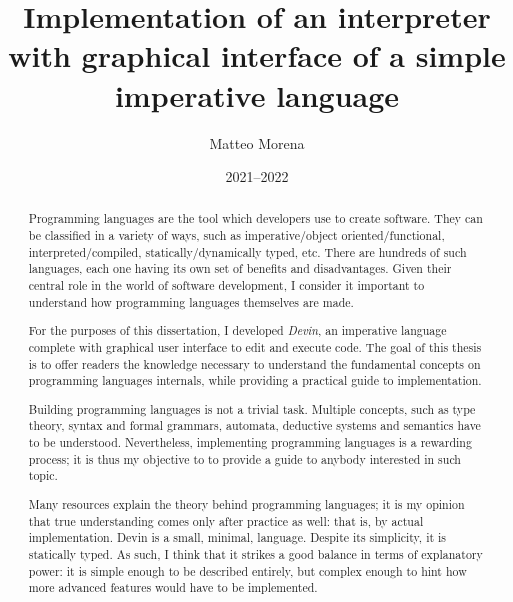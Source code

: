 \documentclass[UdineBachThesis,american,11pt]{PhdThesis}
\author{Matteo Morena}
\date{2021--2022}
\title{
  Implementation of an interpreter with graphical interface of a simple
  imperative language
}
\begin{document}
  \pagestyle{empty}

  \maketitle

  \cleardoublepage


  \begin{abstract}
    Programming languages are the tool which developers use to create software.
    They can be classified in a variety of ways, such as imperative/object
    oriented/functional, interpreted/compiled, statically/dynamically typed,
    etc. There are hundreds of such languages, each one having its own set of
    benefits and disadvantages. Given their central role in the world of
    software development, I consider it important to understand how programming
    languages themselves are made.

    For the purposes of this dissertation, I developed \emph{Devin}, an
    imperative language complete with graphical user interface to edit and
    execute code. The goal of this thesis is to offer readers the knowledge
    necessary to understand the fundamental concepts on programming languages
    internals, while providing a practical guide to implementation.

    Building programming languages is not a trivial task. Multiple concepts,
    such as type theory, syntax and formal grammars, automata, deductive systems
    and semantics have to be understood. Nevertheless, implementing programming
    languages is a rewarding process; it is thus my objective to to provide a
    guide to anybody interested in such topic.

    Many resources explain the theory behind programming languages; it is my
    opinion that true understanding comes only after practice as well: that is,
    by actual implementation. Devin is a small, minimal, language. Despite its
    simplicity, it is statically typed. As such, I think that it strikes a good
    balance in terms of explanatory power: it is simple enough to be described
    entirely, but complex enough to hint how more advanced features would have
    to be implemented.
  \end{abstract}


  \begin{acknowledgments}
  \end{acknowledgments}
\end{document}
